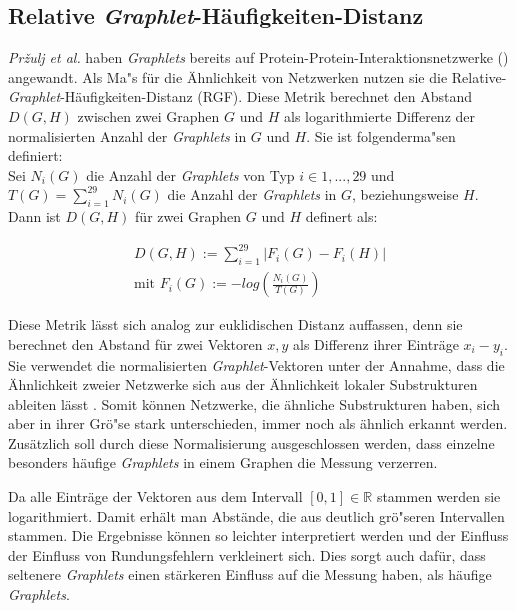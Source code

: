 \documentclass{report}
\begin{document}
\subsection{Relative \textit{Graphlet}-H\"aufigkeiten-Distanz}

\textit{Pr\v{z}ulj et al.} haben \textit{Graphlets} bereits auf Protein-Protein-Interaktionsnetzwerke (\cite{frqdistribution}) angewandt. Als Ma"s f\"ur die \"Ahnlichkeit von Netzwerken nutzen sie die Relative-\textit{Graphlet}-H\"aufigkeiten-Distanz (RGF). Diese Metrik berechnet den Abstand $D(G,H)$ zwischen zwei Graphen $G$ und $H$ als logarithmierte Differenz der normalisierten Anzahl der \textit{Graphlets} in $G$ und $H$. Sie ist folgenderma"sen definiert: \\

Sei $N_{i}(G)$ die Anzahl der \textit{Graphlets} von Typ $i \in {1,...,29}$ und \\ $T(G) = \sum_{i = 1}^{29} N_{i}(G)$ die Anzahl der \textit{Graphlets} in $G$, beziehungsweise $H$.\\

Dann ist $D(G,H)$ f\"ur zwei Graphen $G$ und $H$ definert als:

\begin{subequations}
\begin{align*}
D(G,H) := \sum_{i = 1}^{29} | F_{i}(G) - F_{i}(H) | \\
\text{mit } F_{i}(G) := - log(\frac{N_{i}(G)}{T(G)})
\end{align*}
\end{subequations}



Diese Metrik l\"asst sich analog zur euklidischen Distanz auffassen, denn sie berechnet den Abstand f\"ur zwei Vektoren $x,y$ als Differenz ihrer Eintr\"age $x_i -y_i$. Sie verwendet die normalisierten \textit{Graphlet}-Vektoren unter der Annahme, dass die \"Ahnlichkeit zweier Netzwerke sich aus der \"Ahnlichkeit lokaler Substrukturen ableiten l\"asst \cite{frqdistribution}. Somit k\"onnen Netzwerke, die \"ahnliche Substrukturen haben, sich aber in ihrer Gr\"o"se stark unterschieden, immer noch als \"ahnlich erkannt werden. Zus\"atzlich soll durch diese Normalisierung ausgeschlossen werden, dass einzelne besonders h\"aufige \textit{Graphlets} in einem Graphen die Messung verzerren.

Da alle Eintr\"age der Vektoren aus dem Intervall $ [0,1] \in \mathbb{R} $ stammen werden sie logarithmiert. Damit erh\"alt man Abst\"ande, die aus deutlich gr\"o"seren Intervallen stammen. Die Ergebnisse k\"onnen so leichter interpretiert werden und der Einfluss der Einfluss von Rundungsfehlern verkleinert sich. Dies sorgt auch daf\"ur, dass seltenere \textit{Graphlets} einen st\"arkeren Einfluss auf die Messung haben, als h\"aufige \textit{Graphlets}.
 
\end{document}
